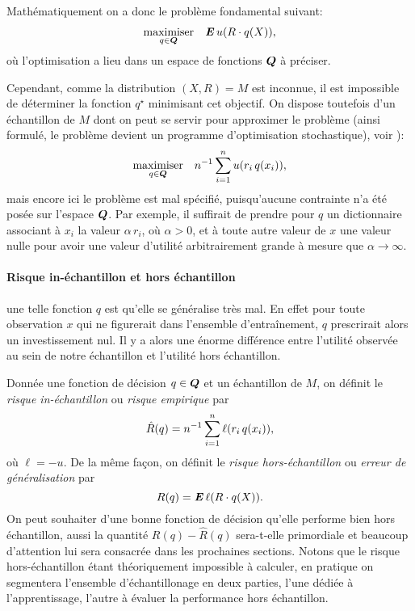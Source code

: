 Mathématiquement on a donc le problème fondamental suivant:
\begin{equation}
  \maximizeEquation[q \in \Q]{\E u(R \cdot q(X)),}
\end{equation}
où l'optimisation a lieu dans un espace de fonctions $\Q$ à préciser.

Cependant, comme la distribution $(X,R) = M$ est inconnue, il est impossible de déterminer
la fonction $q^\star$ minimisant cet objectif. On dispose toutefois d'un échantillon de
$M$ dont on peut se servir pour approximer le problème (ainsi formulé, le problème devient
un programme d'optimisation stochastique), voir \cite{shapiro2009lectures}):
\begin{equation}
  \maximizeEquation[q \in \Q]{n^{-1} \sumi u(r_i\, q(x_i)),}
\end{equation}
mais encore ici le problème est mal spécifié, puisqu'aucune contrainte n'a été posée sur
l'espace $\Q$. Par exemple, il suffirait de prendre pour $q$ un dictionnaire associant à
$x_i$ la valeur $\alpha\,r_i$, où $\alpha > 0$, et à toute autre valeur de $x$ une valeur nulle pour
avoir une valeur d'utilité arbitrairement grande à mesure que $\alpha \to \infty$.


\paragraph{Risque in-échantillon et hors échantillon}

 une telle fonction $q$ est qu'elle se généralise très mal. En effet
pour toute observation $x$ qui ne figurerait dans l'ensemble d'entraînement, $q$
prescrirait alors un investissement nul. Il y a alors une énorme différence entre
l'utilité observée au sein de notre échantillon et l'utilité hors échantillon.

Donnée une fonction de décision $q \in \Q$ et un échantillon de $M$, on définit le
\textit{risque in-échantillon} ou \textit{risque empirique} par
\begin{equation}
  \hat R(q) = n^{-1}\sumi \ell(r_i\,q(x_i)),
\end{equation}
où $\ell = -u$. De la même façon, on définit le \textit{risque hors-échantillon} ou
\textit{erreur de généralisation} par
\begin{equation}
  R(q) = \E \ell(R \cdot q(X)).
\end{equation}
On peut souhaiter d'une bonne fonction de décision qu'elle performe bien hors échantillon,
aussi la quantité $R(q) - \hat R(q)$ sera-t-elle primordiale et beaucoup d'attention lui
sera consacrée dans les prochaines sections. Notons que le risque hors-échantillon étant
théoriquement impossible à calculer, en pratique on segmentera l'ensemble d'échantillonage
en deux parties, l'une dédiée à l'apprentissage, l'autre à évaluer la performance hors
échantillon.


